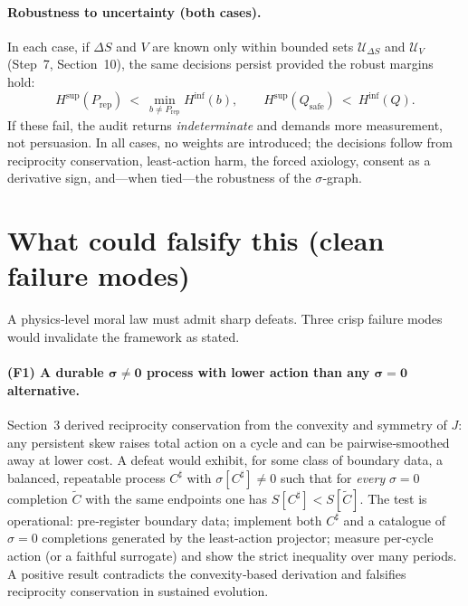 \documentclass[11pt]{article}
\begin{document}
\paragraph{Robustness to uncertainty (both cases).}
In each case, if $\Delta S$ and $V$ are known only within bounded sets $\mathcal{U}_{\Delta S}$ and $\mathcal{U}_V$ (Step~7, Section~10), the same decisions persist provided the robust margins hold:
\[
H^{\sup}(P_{\text{rep}})\ <\ \min_{b\neq P_{\text{rep}}} H^{\inf}(b),
\qquad
H^{\sup}(Q_{\text{safe}})\ <\ H^{\inf}(Q).
\]
If these fail, the audit returns \emph{indeterminate} and demands more measurement, not persuasion. In all cases, no weights are introduced; the decisions follow from reciprocity conservation, least‑action harm, the forced axiology, consent as a derivative sign, and—when tied—the robustness of the $\sigma$‑graph.

\section{What could falsify this (clean failure modes)}

A physics‑level moral law must admit sharp defeats. Three crisp failure modes would invalidate the framework as stated.

\paragraph{(F1) A durable $\boldsymbol{\sigma\neq 0}$ process with lower action than any $\boldsymbol{\sigma=0}$ alternative.}
Section~3 derived reciprocity conservation from the convexity and symmetry of $J$: any persistent skew raises total action on a cycle and can be pairwise‑smoothed away at lower cost. A defeat would exhibit, for some class of boundary data, a balanced, repeatable process $C^\sharp$ with $\sigma[C^\sharp]\neq 0$ such that for \emph{every} $\sigma=0$ completion $\widetilde C$ with the same endpoints one has $S[C^\sharp]<S[\widetilde C]$. The test is operational: pre‑register boundary data; implement both $C^\sharp$ and a catalogue of $\sigma=0$ completions generated by the least‑action projector; measure per‑cycle action (or a faithful surrogate) and show the strict inequality over many periods. A positive result contradicts the convexity‑based derivation and falsifies reciprocity conservation in sustained evolution.
\end{document}
